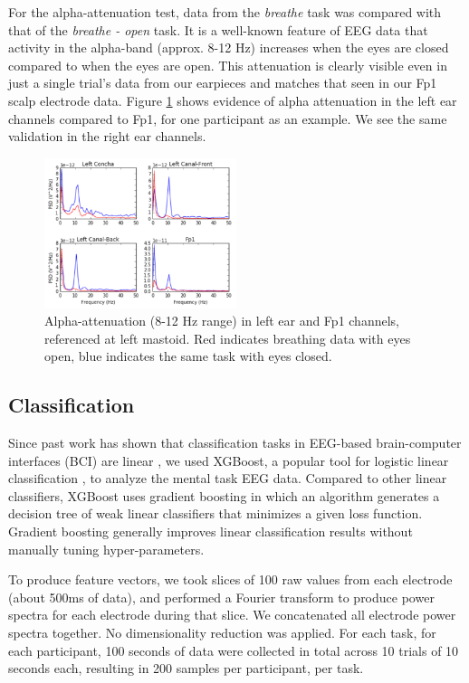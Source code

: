 \documentclass[a4paper,twoside]{article}
\begin{document}
For the alpha-attenuation test, data from the \textit{breathe} task was compared with that of the \textit{breathe - open} task. It is a well-known feature of EEG data that activity in the alpha-band (approx. 8-12 Hz) increases when the eyes are closed compared to when the eyes are open. This attenuation is clearly visible even in just a single trial's data from our earpieces and matches that seen in our Fp1 scalp electrode data. Figure \ref{fig:alpha_atten} shows evidence of alpha attenuation in the left ear channels compared to Fp1, for one participant as an example. We see the same validation in the right ear channels.

\begin{figure}
\centering
\includegraphics[width=0.5\textwidth]{figures/002_AlphaAtt_all.jpg}
\caption{Alpha-attenuation (8-12 Hz range) in left ear and Fp1 channels, referenced at left mastoid. Red indicates breathing data with eyes open, blue indicates the same task with eyes closed.}
\label{fig:alpha_atten}
\end{figure}

\subsection{Classification}

\noindent Since past work has shown that classification tasks in EEG-based brain-computer interfaces (BCI) are linear \cite{Garrett2003a}, we used XGBoost, a popular tool for logistic linear classification \cite{Chen2016}, to analyze the mental task EEG data. Compared to other linear classifiers, XGBoost uses gradient boosting in which an algorithm generates a decision tree of weak linear classifiers that minimizes a given loss function. Gradient boosting generally improves linear classification results without manually tuning hyper-parameters.

To produce feature vectors, we took slices of 100 raw values from each electrode (about 500ms of data), and performed a Fourier transform to produce power spectra for each electrode during that slice. We concatenated all electrode power spectra together. No dimensionality reduction was applied. For each task, for each participant, 100 seconds of data were collected in total across 10 trials of 10 seconds each, resulting in 200 samples per participant, per task.
\end{document}
